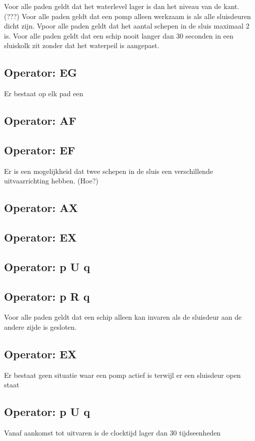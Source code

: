 \documentclass{article}
\begin{document}
	Voor alle paden geldt dat het  waterlevel lager is dan het  niveau van de kant. (???)
	Voor alle paden geldt dat een pomp alleen werkzaam is als alle sluisdeuren dicht zijn.
	Vpoor alle paden geldt dat het aantal schepen in de sluis maximaal 2 is.
	Voor alle paden  geldt dat een schip nooit langer dan 30 seconden in een sluiskolk zit zonder dat het waterpeil is aangepast.
	\subsection{Operator: EG}
	Er bestaat op elk pad een 

	\subsection{Operator: AF}
	
	\subsection{Operator: EF}
	Er is een mogelijkheid dat twee schepen in de sluis een verschillende uitvaarrichting hebben. (Hoe?)
	\subsection{Operator: AX}

	
	\subsection{Operator: EX}
	
	\subsection{Operator: p U q}
	
	\subsection{Operator: p R q}
	

	Voor alle paden geldt dat een schip alleen kan invaren als de sluisdeur aan de andere zijde is gesloten.
	\subsection{Operator: EX}
	Er bestaat geen situatie waar een pomp actief is terwijl er een sluisdeur open staat
	\subsection{Operator: p U q}
	Vanaf aankomst tot uitvaren is de clocktijd lager dan 30 tijdseenheden 
\end{document}

